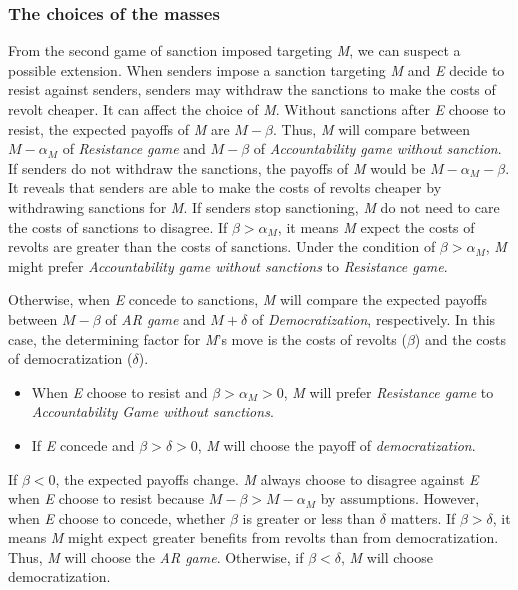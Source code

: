 \documentclass[11pt, letterpage]{article}
\begin{document}
\subsubsection*{The choices of the masses}

From the second game of sanction imposed targeting \textit{M}, we can suspect a possible extension. When senders impose a sanction targeting \textit{M} and \textit{E} decide to resist against senders, senders may withdraw the sanctions to make the costs of revolt cheaper. It can affect the choice of \textit{M}. Without sanctions after \textit{E} choose to resist, the expected payoffs of \textit{M} are $M-\beta$. Thus, \textit{M} will compare between $M-\alpha_{M}$ of \textit{Resistance game} and $M-\beta$ of \textit{Accountability game without sanction}. If senders do not withdraw the sanctions, the payoffs of \textit{M} would be $M-\alpha_{M}-\beta$. It reveals that senders are able to make the costs of revolts cheaper by withdrawing sanctions for \textit{M}. If senders stop sanctioning, \textit{M} do not need to care the costs of sanctions to disagree. If $\beta > \alpha_{M}$, it means \textit{M} expect the costs of revolts are greater than the costs of sanctions. Under the condition of $\beta  > \alpha_{M}$, \textit{M} might prefer \textit{Accountability game without sanctions} to \textit{Resistance game}.

Otherwise, when \textit{E} concede to sanctions, \textit{M} will compare the expected payoffs between $M-\beta$ of \textit{AR game} and $M + \delta$ of \textit{Democratization}, respectively. In this case, the determining factor for \textit{M}'s move is the costs of revolts ($\beta$) and the costs of democratization ($\delta$).

\begin{itemize}
	\item When \textit{E} choose to resist and $\beta > \alpha_{M} > 0$, \textit{M} will prefer \textit{Resistance game} to \textit{Accountability Game without sanctions}.
	\item If \textit{E} concede and $\beta > \delta > 0$, \textit{M} will choose the payoff of \textit{democratization}.
\end{itemize}

If $\beta < 0$, the expected payoffs change. \textit{M} always choose to disagree against \textit{E} when \textit{E} choose to resist because $M-\beta > M-\alpha_{M}$ by assumptions. However, when \textit{E} choose to concede, whether $\beta$ is greater or less than $\delta$ matters. If $\beta > \delta$, it means \textit{M} might expect greater benefits from revolts than from democratization. Thus, \textit{M} will choose the \textit{AR game}. Otherwise, if $\beta < \delta$, \textit{M} will choose democratization.
\end{document}
